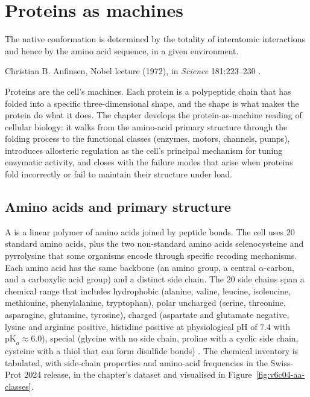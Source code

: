 \chapter{Proteins as machines}
\label{vol06:ch04}

\epigraph{The native conformation is determined by the totality of
interatomic interactions and hence by the amino acid sequence, in a
given environment.}{Christian B. Anfinsen, Nobel lecture (1972), in
\emph{Science} 181:223--230 \cite[p.~223]{paper:anfinsen1973-protein-folding}.}


\noindent
Proteins are the cell's machines. Each protein is a polypeptide chain
that has folded into a specific three-dimensional shape, and the
shape is what makes the protein do what it does. The chapter develops
the protein-as-machine reading of cellular biology: it walks from the
amino-acid primary structure through the folding process to the
functional classes (enzymes, motors, channels, pumps), introduces
allosteric regulation as the cell's principal mechanism for tuning
enzymatic activity, and closes with the failure modes that arise when
proteins fold incorrectly or fail to maintain their structure under
load.

\section{Amino acids and primary structure}

A  is a linear polymer of amino acids joined by
peptide bonds. The cell uses $20$ standard amino acids, plus the two
non-standard amino acids selenocysteine and pyrrolysine that some
organisms encode through specific recoding mechanisms. Each amino
acid has the same backbone (an amino group, a central $\alpha$-carbon,
and a carboxylic acid group) and a distinct side chain. The $20$
side chains span a chemical range that includes hydrophobic
(alanine, valine, leucine, isoleucine, methionine, phenylalanine,
tryptophan), polar uncharged (serine, threonine, asparagine,
glutamine, tyrosine), charged (aspartate and glutamate negative,
lysine and arginine positive, histidine positive at physiological pH
of $7.4$ with $\text{pK}_a \approx 6.0$), special (glycine with no
side chain, proline with a cyclic side chain, cysteine with a thiol
that can form disulfide bonds) \cite[ch.~3]{text:lehninger-biochemistry}.
The chemical inventory is tabulated, with side-chain properties and
amino-acid frequencies in the Swiss-Prot 2024 release, in the chapter's
 dataset and visualised in
Figure~\ref{fig:v6c04-aa-classes}.


